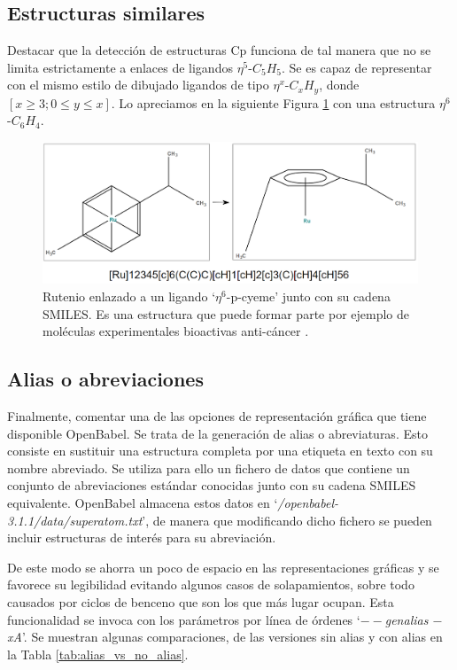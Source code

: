 \subsection{Estructuras similares}
Destacar que la detección de estructuras Cp funciona de tal manera que no se limita estrictamente a enlaces de ligandos $\eta^{5}$-$C_{5}H_{5}$. Se es capaz de representar con el mismo estilo de dibujado ligandos de tipo $\eta^{x}$-$C_{x}H_{y}$, donde $[x \geq 3; 0 \leq y \leq x]$. Lo apreciamos en la siguiente Figura \ref{fig:n6_ligand_cp} con una estructura $\eta^{6}$-$C_{6}H_{4}$.

\begin{figure}[h!]
    \centering
    \includegraphics[scale=0.32]{imagenes/resultados/moleculas/Rutenio_n6_ligand_vs_original.png}
    \caption{Rutenio enlazado a un ligando `$\eta^{6}$-p-cyeme' junto con su cadena SMILES. Es una estructura que puede formar parte por ejemplo de moléculas experimentales bioactivas anti-cáncer \cite{rutenio_diimines_2018}.}
    \label{fig:n6_ligand_cp}
\end{figure}





\subsection{Alias o abreviaciones}
Finalmente, comentar una de las opciones de representación gráfica que tiene disponible OpenBabel. Se trata de la generación de alias o abreviaturas. Esto consiste en sustituir una estructura completa por una etiqueta en texto con su nombre abreviado. Se utiliza para ello un fichero de datos que contiene un conjunto de abreviaciones estándar conocidas junto con su cadena SMILES equivalente. OpenBabel almacena estos datos en `\textit{/openbabel-3.1.1/data/superatom.txt}', de manera que modificando dicho fichero se pueden incluir estructuras de interés para su abreviación.

De este modo se ahorra un poco de espacio en las representaciones gráficas y se favorece su legibilidad evitando algunos casos de solapamientos, sobre todo causados por ciclos de benceno que son los que más lugar ocupan. Esta funcionalidad se invoca con los parámetros por línea de órdenes `\textit{$--$genalias $-$xA}'. Se muestran algunas comparaciones, de las versiones sin alias y con alias en la Tabla \ref{tab:alias_vs_no_alias}.


